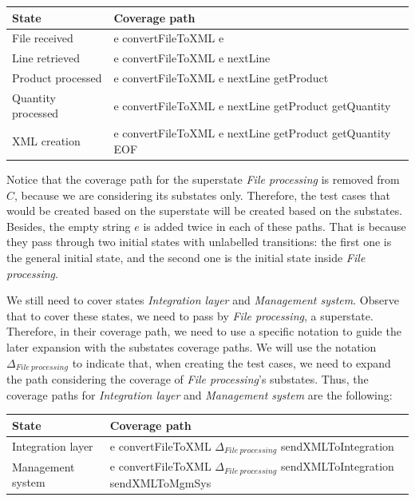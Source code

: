 \begin{center}
\begin{tabular}{| l | l|}

\hline

State & Coverage path \\ \hline

File received & e convertFileToXML e \\ \hline

Line retrieved & e convertFileToXML e nextLine\\ \hline

Product processed & e convertFileToXML e nextLine getProduct\\ \hline

Quantity processed & e convertFileToXML e nextLine getProduct getQuantity\\ \hline

XML creation & e convertFileToXML e nextLine getProduct getQuantity EOF\\ 

\hline
\end{tabular}
\end{center}

Notice that the coverage path for the superstate \textit{File processing} is removed from $C$, because we are considering its substates only. Therefore, the test cases that would be created based on the superstate will be created based on the substates. Besides, the empty string $e$ is added twice in each of these paths. That is because they pass through two initial states with unlabelled transitions: the first one is the general initial state, and the second one is the initial state inside \textit{File processing}.

We still need to cover states \textit{Integration layer} and \textit{Management system}. Observe that to cover these states, we need to pass by \textit{File processing}, a superstate. Therefore, in their coverage path, we need to use a specific notation to guide the later expansion with the substates coverage paths. We will use the notation $\Delta_{File\ processing}$ to indicate that, when creating the test cases, we need to expand the path considering the coverage of \textit{File processing}'s substates. Thus, the coverage paths for \textit{Integration layer} and \textit{Management system} are the following:

\begin{center}
\begin{tabular}{| l | p{10cm}|}

\hline

State & Coverage path \\ \hline

Integration layer & e convertFileToXML $\Delta_{File\ processing}$ sendXMLToIntegration \\ \hline

Management system & e convertFileToXML $\Delta_{File\ processing}$ sendXMLToIntegration sendXMLToMgmSys\\

\hline
\end{tabular}
\end{center}

